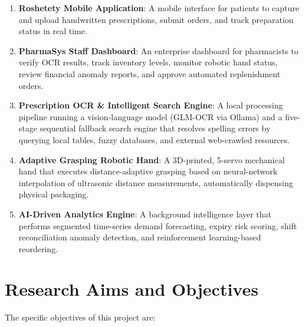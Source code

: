\documentclass[12pt,a4paper,oneside]{report}
\begin{document}
\begin{enumerate}
\def\labelenumi{\arabic{enumi})}
\item
  \textbf{Roshetety Mobile Application}: A mobile interface for patients
  to capture and upload handwritten prescriptions, submit orders, and
  track preparation status in real time.
\item
  \textbf{PharmaSys Staff Dashboard}: An enterprise dashboard for
  pharmacists to verify OCR results, track inventory levels, monitor
  robotic hand status, review financial anomaly reports, and approve
  automated replenishment orders.
\item
  \textbf{Prescription OCR \& Intelligent Search Engine}: A local
  processing pipeline running a vision-language model (GLM-OCR via
  Ollama) and a five-stage sequential fallback search engine that
  resolves spelling errors by querying local tables, fuzzy databases,
  and external web-crawled resources.
\item
  \textbf{Adaptive Grasping Robotic Hand}: A 3D-printed, 5-servo
  mechanical hand that executes distance-adaptive grasping based on
  neural-network interpolation of ultrasonic distance measurements,
  automatically dispensing physical packaging.
\item
  \textbf{AI-Driven Analytics Engine}: A background intelligence layer
  that performs segmented time-series demand forecasting, expiry risk
  scoring, shift reconciliation anomaly detection, and reinforcement
  learning-based reordering.
\end{enumerate}

\section{Research Aims and
Objectives}\label{research-aims-and-objectives}

The specific objectives of this project are:
\end{document}
